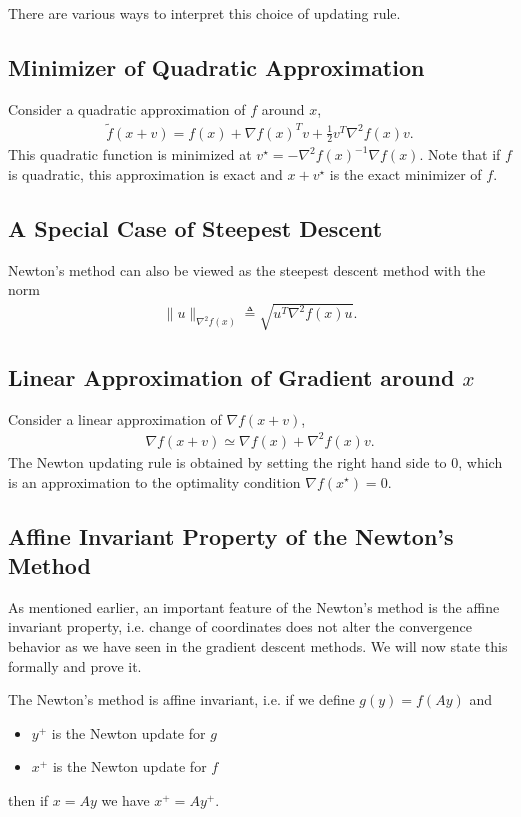 \documentclass[12pt]{report}
\begin{document}
There are various ways to interpret this choice of updating rule.
\subsection*{Minimizer of Quadratic Approximation}
Consider a quadratic approximation of $f$ around $x$,
\begin{align}
\tilde{f}(x+v) = f(x) + \nabla f(x)^T v + \frac{1}{2} v^T \nabla^2 f(x) v.
\end{align}
This quadratic function is minimized at $v^\star =-\nabla^2 f(x)^{-1} \nabla f(x)$. 
Note that if $f$ is quadratic, this approximation is exact and $x+v^\star$ is the exact minimizer of $f$. 
\subsection*{A Special Case of Steepest Descent}
Newton's method can also be viewed as the steepest descent method with the norm
\begin{align}
\| u \|_{\nabla^2 f(x)} \triangleq \sqrt{u^T \nabla^2 f(x) u}.
\end{align}

\subsection*{Linear Approximation of Gradient around $x$}
Consider a linear approximation of $\nabla f(x+v)$,
\begin{align}
\nabla f(x+v) \simeq \nabla f(x) + \nabla^2 f(x) v.
\end{align}
The Newton updating rule is obtained by setting the right hand side to $0$, which is an approximation to the optimality condition $\nabla f(x^\star)=0$.

\subsection*{Affine Invariant Property of the Newton's Method}
As mentioned earlier, an important feature of the Newton's method is the affine invariant property, i.e. change of coordinates does not alter the convergence behavior as we have seen in the gradient descent methods. We will now state this formally and prove it.
\begin{lemma}
The Newton's method is affine invariant, i.e. if we define $g(y)=f(Ay)$ and 
\begin{itemize}
\item $y^{+}$ is the Newton update for $g$
\item $x^{+}$ is the Newton update for $f$
\end{itemize}
then if $x=Ay$ we have $x^{+}=Ay^{+}$. 
\end{lemma}
\end{document}
